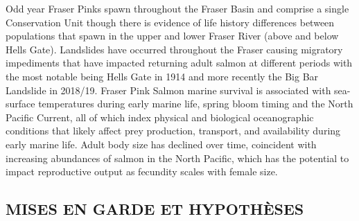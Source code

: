 \documentclass[french,11pt]{book}
\begin{document}
Odd year Fraser Pinks spawn throughout the Fraser Basin and comprise a single Conservation Unit though there is evidence of life history differences between populations that spawn in the upper and lower Fraser River (above and below Hells Gate). Landslides have occurred throughout the Fraser causing migratory impediments that have impacted returning adult salmon at different periods with the most notable being Hells Gate in 1914 and more recently the Big Bar Landslide in 2018/19. Fraser Pink Salmon marine survival is associated with sea-surface temperatures during early marine life, spring bloom timing and the North Pacific Current, all of which index physical and biological oceanographic conditions that likely affect prey production, transport, and availability during early marine life. Adult body size has declined over time, coincident with increasing abundances of salmon in the North Pacific, which has the potential to impact reproductive output as fecundity scales with female size.

\hypertarget{mises-en-garde-et-hypothuxe8ses}{%
\subsection{MISES EN GARDE ET HYPOTHÈSES}\label{mises-en-garde-et-hypothuxe8ses}}
\end{document}
